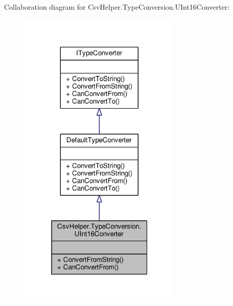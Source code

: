 Collaboration diagram for Csv\-Helper.\-Type\-Conversion.\-U\-Int16\-Converter\-:
\nopagebreak
\begin{figure}[H]
\begin{center}
\leavevmode
\includegraphics[width=220pt]{a00561}
\end{center}
\end{figure}
